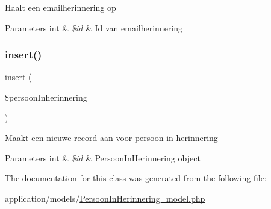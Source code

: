 Haalt een emailherinnering op 
\begin{DoxyParams}[1]{Parameters}
int & {\em \$id} & Id van emailherinnering \\
\hline
\end{DoxyParams}
\mbox{\label{class_persoon_in_herinnering__model_a73e9de4fbc1e49790caee7218edb874a}} 
\subsubsection{\texorpdfstring{insert()}{insert()}}
{\footnotesize\ttfamily insert (\begin{DoxyParamCaption}\item[{}]{\$persoon\+Inherinnering }\end{DoxyParamCaption})}

Maakt een nieuwe record aan voor persoon in herinnering 
\begin{DoxyParams}[1]{Parameters}
int & {\em \$id} & Persoon\+In\+Herinnering object \\
\hline
\end{DoxyParams}


The documentation for this class was generated from the following file\+:\begin{DoxyCompactItemize}
\item 
application/models/\mbox{\hyperlink{_persoon_in_herinnering__model_8php}{Persoon\+In\+Herinnering\+\_\+model.\+php}}\end{DoxyCompactItemize}
